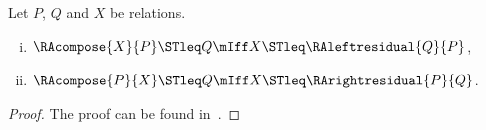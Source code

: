 \begin{proposition}
\label{prop:residue}
	Let $P$, $Q$ and $X$ be relations.
	\begin{enumerate}[(i)]
   		\item $\RAcompose{X}{P} \STleq Q \mIff X \STleq \RAleftresidual{Q}{P}$,
   		\item $\RAcompose{P}{X} \STleq Q \mIff X \STleq \RArightresidual{P}{Q}$.
	\end{enumerate}
	
\begin{proof}
	The proof can be found in~\cite{Khedri1998aa,Schmidt1993aa}.
\end{proof}
	
\end{proposition}

